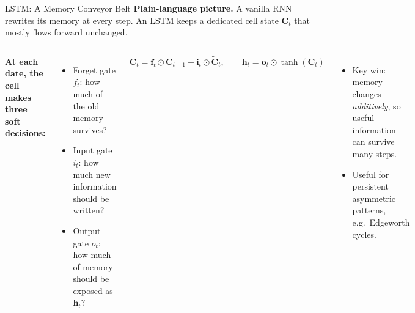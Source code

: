 \documentclass[aspectratio=169,11pt]{beamer}
\newcommand{\emphc}[1]{\textcolor{harvardcrimson}{#1}}
\begin{document}
\begin{frame}{LSTM: A Memory Conveyor Belt}
\footnotesize
\textbf{Plain-language picture.} A vanilla RNN rewrites its memory at every step.  An LSTM keeps a dedicated \emphc{cell state} $\bm{C}_t$ that mostly flows forward unchanged.

\vspace{2pt}
\begin{columns}[T]
\textbf{At each date, the cell makes three soft decisions:}
\begin{itemize}\itemsep1pt
    \item \emphc{Forget gate} $f_t$: how much of the old memory survives?
    \item \emphc{Input gate} $i_t$: how much new information should be written?
    \item \emphc{Output gate} $o_t$: how much of memory should be exposed as $\bm{h}_t$?
\end{itemize}

\vspace{2pt}
\[
\bm{C}_t = \bm{f}_t \odot \bm{C}_{t-1} + \bm{i}_t \odot \tilde{\bm{C}}_t,
\qquad
\bm{h}_t = \bm{o}_t \odot \tanh(\bm{C}_t)
\]

\vspace{1pt}
\begin{itemize}\itemsep1pt
    \item \emphc{Key win:} memory changes \emph{additively}, so useful information can survive many steps.
    \item Useful for persistent asymmetric patterns, e.g.\ Edgeworth cycles.
\end{itemize}


\end{columns}
\end{frame}
\end{document}
